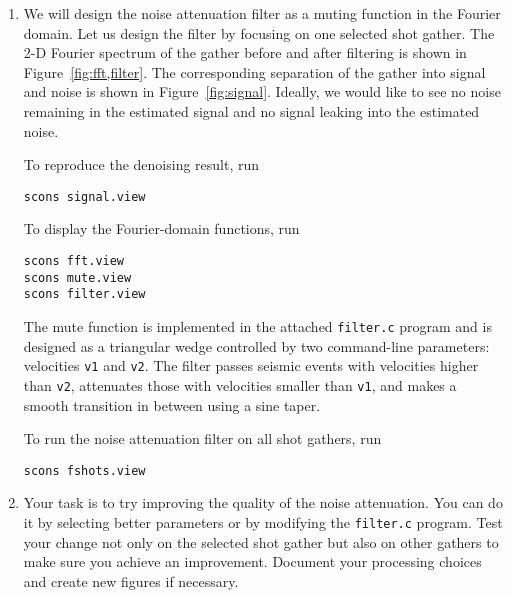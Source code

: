 \begin{enumerate}     
\item We will design the noise attenuation filter as a muting function in the Fourier domain. 
Let us design the filter by focusing on one selected shot gather. The
2-D Fourier spectrum of the gather before and after filtering is shown
in Figure~\ref{fig:fft,filter}. The corresponding separation of the gather into signal and noise 
is shown in Figure~\ref{fig:signal}. Ideally, we would like to see no noise remaining in the 
estimated signal and no signal leaking into the estimated noise.

To reproduce the denoising result, run
\begin{verbatim}
scons signal.view
\end{verbatim}
To display the Fourier-domain functions, run
\begin{verbatim}
scons fft.view
scons mute.view
scons filter.view
\end{verbatim}

The mute function is implemented in the attached \texttt{filter.c}
program and is designed as a triangular wedge controlled by two
command-line parameters: velocities \texttt{v1} and \texttt{v2}. The
filter passes seismic events with velocities higher than \texttt{v2},
attenuates those with velocities smaller than \texttt{v1}, and makes a
smooth transition in between using a sine taper. 



To run the noise attenuation filter on all shot gathers, run
\begin{verbatim}
scons fshots.view
\end{verbatim}

\item Your task is to try improving the quality of the noise attenuation. You can do it by selecting 
better parameters or by modifying the \texttt{filter.c} program. Test your change not only on the selected 
shot gather but also on other gathers to make sure you achieve an improvement. Document your processing 
choices and create new figures if necessary.

\end{enumerate}


